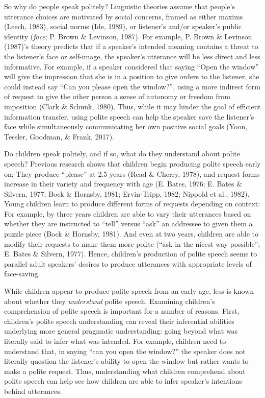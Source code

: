 \documentclass[oneside]{report}
\begin{document}
So why do people speak politely? Linguistic theories assume that
people's utterance choices are motivated by social concerns, framed as
either maxims (Leech, 1983), social norms (Ide, 1989), or listener's
and/or speaker's public identity (\emph{face}; P. Brown \& Levinson,
1987). For example, P. Brown \& Levinson (1987)'s theory predicts that
if a speaker's intended meaning contains a threat to the listener's face
or self-image, the speaker's utterance will be less direct and less
informative. For example, if a speaker considered that saying ``Open the
window'' will give the impression that she is in a position to give
orders to the listener, she could instead say ``Can you please open the
window?'', using a more indirect form of request to give the other
person a sense of autonomy or freedom from imposition (Clark \& Schunk,
1980). Thus, while it may hinder the goal of efficient information
transfer, using polite speech can help the speaker save the listener's
face while simultaneously communicating her own positive social goals
(Yoon, Tessler, Goodman, \& Frank, 2017).

Do children speak politely, and if so, what do they understand about
polite speech? Previous research shows that children begin producing
polite speech early on; They produce ``please'' at 2.5 years (Read \&
Cherry, 1978), and request forms increase in their variety and frequency
with age (E. Bates, 1976; E. Bates \& Silvern, 1977; Bock \& Hornsby,
1981; Ervin-Tripp, 1982; Nippold et al., 1982). Young children learn to
produce different forms of requests depending on context: For example,
by three years children are able to vary their utterances based on
whether they are instructed to ``tell'' versus ``ask'' an addressee to
given them a puzzle piece (Bock \& Hornsby, 1981). And even at two
years, children are able to modify their requests to make them more
polite (``ask in the nicest way possible''; E. Bates \& Silvern, 1977).
Hence, children's production of polite speech seems to parallel adult
speakers' desires to produce utterances with appropriate levels of
face-saving.

While children appear to produce polite speech from an early age, less
is known about whether they \emph{understand} polite speech. Examining
children's comprehension of polite speech is important for a number of
reasons. First, children's polite speech understanding can reveal their
inferential abilities underlying more general pragmatic understanding:
going beyond what was literally said to infer what was intended. For
example, children need to understand that, in saying ``can you open the
window?'' the speaker does not literally question the listener's ability
to open the window but rather wants to make a polite request. Thus,
understanding what children comprehend about polite speech can help see
how children are able to infer speaker's intentions behind utterances.
\end{document}
